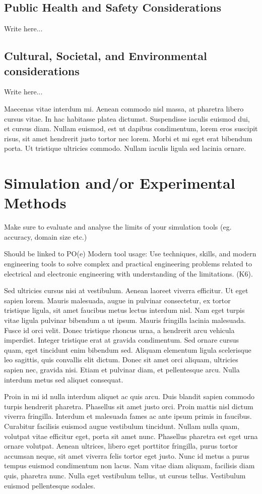 \subsection{ Public Health and Safety Considerations}
Write here...
\subsection{Cultural, Societal, and Environmental considerations}
Write here...


Maecenas vitae interdum mi. Aenean commodo nisl massa, at pharetra
libero cursus vitae. In hac habitasse platea dictumst. Suspendisse
iaculis euismod dui, et cursus diam. Nullam euismod, est ut dapibus
condimentum, lorem eros suscipit risus, sit amet hendrerit justo
tortor nec lorem. Morbi et mi eget erat bibendum porta. Ut tristique
ultricies commodo. Nullam iaculis ligula sed lacinia ornare.

\section{Simulation and/or Experimental Methods}

Make sure to evaluate and analyse the limits of your simulation tools (eg. accuracy, domain size etc.)

Should be linked to PO(e) Modern tool usage: Use techniques, skills, and modern engineering tools to solve complex and practical engineering problems related to electrical and electronic engineering with understanding of the limitations. (K6).

Sed ultricies cursus nisi at vestibulum. Aenean laoreet viverra
efficitur. Ut eget sapien lorem. Mauris malesuada, augue in pulvinar
consectetur, ex tortor tristique ligula, sit amet faucibus metus
lectus interdum nisl. Nam eget turpis vitae ligula pulvinar bibendum a
ut ipsum. Mauris fringilla lacinia malesuada. Fusce id orci
velit. Donec tristique rhoncus urna, a hendrerit arcu vehicula
imperdiet. Integer tristique erat at gravida condimentum. Sed ornare
cursus quam, eget tincidunt enim bibendum sed. Aliquam elementum
ligula scelerisque leo sagittis, quis convallis elit dictum. Donec sit
amet orci aliquam, ultricies sapien nec, gravida nisi. Etiam et
pulvinar diam, et pellentesque arcu. Nulla interdum metus sed aliquet
consequat.

Proin in mi id nulla interdum aliquet ac quis arcu. Duis blandit
sapien commodo turpis hendrerit pharetra. Phasellus sit amet justo
orci. Proin mattis nisl dictum viverra fringilla. Interdum et
malesuada fames ac ante ipsum primis in faucibus. Curabitur facilisis
euismod augue vestibulum tincidunt. Nullam nulla quam, volutpat vitae
efficitur eget, porta sit amet nunc. Phasellus pharetra est eget urna
ornare volutpat. Aenean ultrices, libero eget porttitor fringilla,
purus tortor accumsan neque, sit amet viverra felis tortor eget
justo. Nunc id metus a purus tempus euismod condimentum non lacus. Nam
vitae diam aliquam, facilisis diam quis, pharetra nunc. Nulla eget
vestibulum tellus, ut cursus tellus. Vestibulum euismod pellentesque
sodales.

